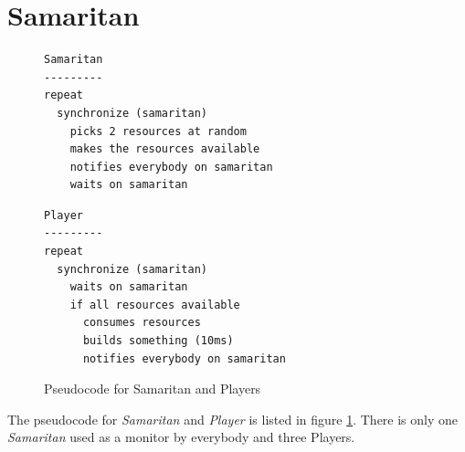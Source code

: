 \documentclass[12pt]{article}
\begin{document}
\begin{table}[h!]
  \small
  \caption{Pause, waiting, working times for 20 builders.}
  \label{tbl:builders}
\end{table}

\newpage
\section{Samaritan}

\begin{figure}[h!]
  \small
  \begin{minipage}{0.5\linewidth}
    \begin{Verbatim}[frame=single]
Samaritan
---------
repeat
  synchronize (samaritan)
    picks 2 resources at random
    makes the resources available
    notifies everybody on samaritan
    waits on samaritan

    \end{Verbatim}
  \end{minipage}
  \begin{minipage}{0.5\linewidth}
    \begin{Verbatim}[frame=single]
Player
---------
repeat
  synchronize (samaritan)
    waits on samaritan
    if all resources available
      consumes resources
      builds something (10ms)
      notifies everybody on samaritan
    \end{Verbatim}
  \end{minipage}
  \caption{Pseudocode for Samaritan and Players}
  \label{fig:samaritan-pseudocode}
\end{figure}

The pseudocode for \emph{Samaritan} and \emph{Player} is listed in figure
\ref{fig:samaritan-pseudocode}. There is only one \emph{Samaritan} used
as a monitor by everybody and three Players.
\end{document}
